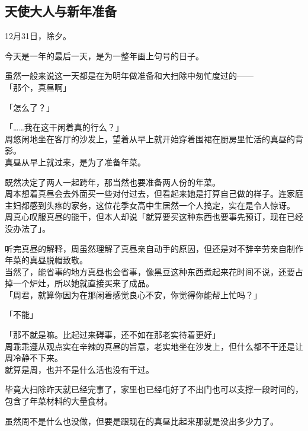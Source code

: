 \subsection{天使大人与新年准备}

12月31日，除夕。

今天是一年的最后一天，是为一整年画上句号的日子。

虽然一般来说这一天都是在为明年做准备和大扫除中匆忙度过的——\\

「那个，真昼啊」

「怎么了？」

「……我在这干闲着真的行么？」\\

周悠闲地坐在客厅的沙发上，望着从早上就开始穿着围裙在厨房里忙活的真昼的背影。\\

真昼从早上就过来，是为了准备年菜。

既然决定了两人一起跨年，那当然也要准备两人份的年菜。\\

周本想着真昼会去外面买一些对付过去，但看起来她是打算自己做的样子。连家庭主妇都感到头疼的家务，这位花季女高中生居然一个人搞定，实在是令人惊讶。\\

周真心叹服真昼的能干，但本人却说「就算要买这种东西也要事先预订，现在已经没办法了」。

听完真昼的解释，周虽然理解了真昼亲自动手的原因，但还是对不辞辛劳亲自制作年菜的真昼脱帽致敬。\\

当然了，能省事的地方真昼也会省事，像黑豆这种东西煮起来花时间不说，还要占掉一个炉灶，所以她就直接买来了成品。\\

「周君，就算你因为在那闲着感觉良心不安，你觉得你能帮上忙吗？」

「不能」

「那不就是嘛。比起过来碍事，还不如在那老实待着更好」\\

周乖乖遵从观点实在辛辣的真昼的旨意，老实地坐在沙发上，但什么都不干还是让周冷静不下来。\\

就算是周，也并不是什么活也没有干过。

毕竟大扫除昨天就已经完事了，家里也已经屯好了不出门也可以支撑一段时间的，包含了年菜材料的大量食材。

虽然周不是什么也没做，但要是跟现在的真昼比起来那就是没出多少力了。\\

